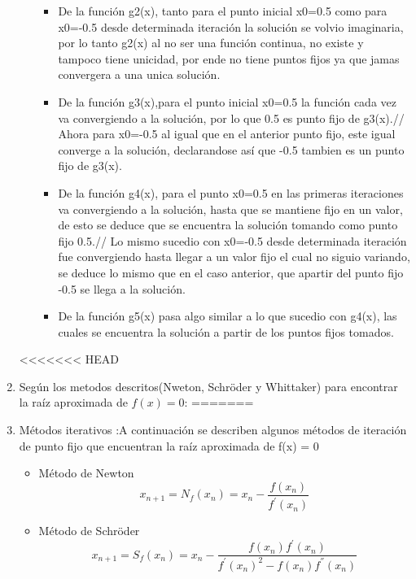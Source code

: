 \documentclass{udparticle}
\begin{document}
\begin{enumerate}
\begin{enumerate}
\begin{itemize}
\item De la función g2(x), tanto para el punto inicial x0=0.5 como para x0=-0.5 desde determinada iteración la solución se volvio imaginaria, por lo tanto g2(x) al no ser una función continua, no existe y tampoco tiene unicidad, por ende no tiene puntos fijos ya que jamas convergera a una unica solución.
\item De la función g3(x),para el punto inicial x0=0.5 la función cada vez va convergiendo a la solución, por lo que 0.5 es punto fijo de g3(x).// Ahora para x0=-0.5 al igual que en el anterior punto fijo, este igual converge a la solución, declarandose así que -0.5 tambien es un punto fijo de g3(x).
\item De la función g4(x), para el punto x0=0.5 en las primeras iteraciones va convergiendo a la solución, hasta que se mantiene fijo en un valor, de esto se deduce que se encuentra la solución tomando como punto fijo 0.5.//
Lo mismo sucedio con x0=-0.5 desde determinada iteración fue convergiendo hasta llegar a un valor fijo el cual no siguio variando, se deduce lo mismo que en el caso anterior, que apartir del punto fijo -0.5 se llega a la solución.
\item De la función g5(x) pasa algo similar a lo que sucedio con g4(x), las cuales se encuentra la solución a partir de los puntos fijos tomados.
\end{itemize}

\end{enumerate}
<<<<<<< HEAD
\item Según los metodos descritos(Nweton, Schröder y Whittaker) para encontrar la raíz aproximada de $f(x)=0$:
=======
\newpage
\item Métodos iterativos :A continuación se describen algunos métodos de iteración de punto fijo que encuentran la raíz aproximada de f(x) = 0
\begin{itemize}
        \item Método de Newton     
            \begin{equation*}
                 x_{n+1}=N_f(x_n)=x_n -  \frac{f(x_n)}{f^{'}(x_n)}
            \end{equation*}
        
        \item Método de Schröder
            \begin{equation*}
                x_{n+1}=S_f(x_n)=x_n-\frac{f(x_n)f^{'}(x_n)}{f^{'}(x_n)^{2}-f(x_n)f^{''}(x_n)}
            \end{equation*}
        

\end{itemize}
\end{enumerate}
\end{document}
